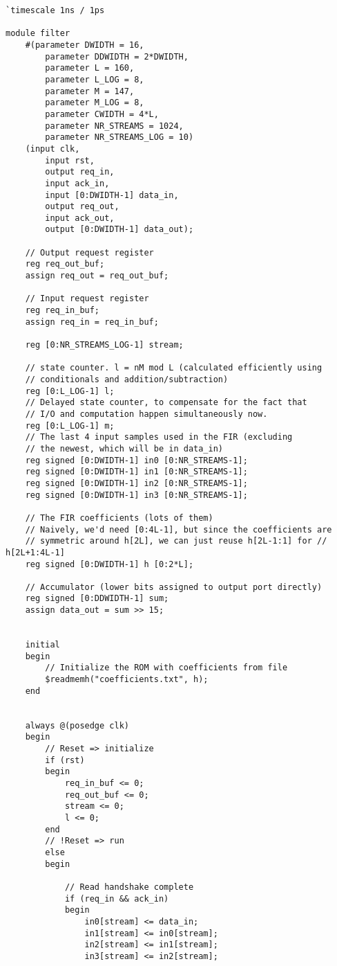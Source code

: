 \begin{verbatim}
`timescale 1ns / 1ps

module filter
    #(parameter DWIDTH = 16,
        parameter DDWIDTH = 2*DWIDTH,
        parameter L = 160,
        parameter L_LOG = 8,
        parameter M = 147,
        parameter M_LOG = 8,
        parameter CWIDTH = 4*L,
        parameter NR_STREAMS = 1024,
        parameter NR_STREAMS_LOG = 10)
    (input clk,
        input rst,
        output req_in,
        input ack_in,
        input [0:DWIDTH-1] data_in,
        output req_out,
        input ack_out,
        output [0:DWIDTH-1] data_out);

    // Output request register
    reg req_out_buf;
    assign req_out = req_out_buf;

    // Input request register
    reg req_in_buf;
    assign req_in = req_in_buf;

    reg [0:NR_STREAMS_LOG-1] stream;

    // state counter. l = nM mod L (calculated efficiently using 
    // conditionals and addition/subtraction)
    reg [0:L_LOG-1] l;
    // Delayed state counter, to compensate for the fact that 
    // I/O and computation happen simultaneously now.
    reg [0:L_LOG-1] m;
    // The last 4 input samples used in the FIR (excluding 
    // the newest, which will be in data_in)
    reg signed [0:DWIDTH-1] in0 [0:NR_STREAMS-1];
    reg signed [0:DWIDTH-1] in1 [0:NR_STREAMS-1];
    reg signed [0:DWIDTH-1] in2 [0:NR_STREAMS-1];
    reg signed [0:DWIDTH-1] in3 [0:NR_STREAMS-1];

    // The FIR coefficients (lots of them)
    // Naively, we'd need [0:4L-1], but since the coefficients are
    // symmetric around h[2L], we can just reuse h[2L-1:1] for // h[2L+1:4L-1]
    reg signed [0:DWIDTH-1] h [0:2*L];

    // Accumulator (lower bits assigned to output port directly)
    reg signed [0:DDWIDTH-1] sum;
    assign data_out = sum >> 15;


    initial
    begin
        // Initialize the ROM with coefficients from file
        $readmemh("coefficients.txt", h);
    end


    always @(posedge clk)
    begin
        // Reset => initialize
        if (rst)
        begin
            req_in_buf <= 0;
            req_out_buf <= 0;
            stream <= 0;
            l <= 0;
        end
        // !Reset => run
        else
        begin

            // Read handshake complete
            if (req_in && ack_in)
            begin
                in0[stream] <= data_in;
                in1[stream] <= in0[stream];
                in2[stream] <= in1[stream];
                in3[stream] <= in2[stream];


\end{verbatim}
